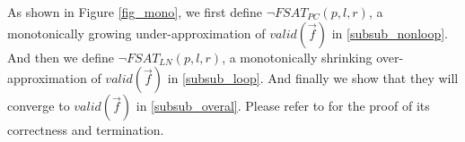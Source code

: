 \documentclass[runningheads,a4paper,orivec]{llncs}
\begin{document}



As shown in Figure \ref{fig_mono},
we first define $\neg FSAT_{PC}(p,l,r)$,
a monotonically growing under-approximation of $valid(\vec{f})$ in \ref{subsub_nonloop}.
And then we define $\neg FSAT_{LN}(p,l,r)$,
a monotonically shrinking over-approximation of $valid(\vec{f})$ in \ref{subsub_loop}.
And finally we show that they will converge to $valid(\vec{f})$ in \ref{subsub_overal}.
Please refer to \cite{QinTODAES15} for the proof of its correctness and termination.

% 
% 



% 
% 
\end{document}
